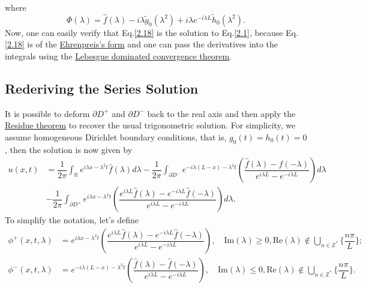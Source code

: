 \documentclass[12pt]{article}
\numberwithin{equation}{section}
\begin{document}
where 
\begin{equation}
    \Phi(\lambda)=\hat{f}(\lambda)-i\lambda\tilde{g}_0(\lambda^2)+i\lambda e^{-i\lambda L}\tilde{h}_0(\lambda^2).
\end{equation}
Now, one can easily verify that Eq.\eqref{2.18} is the solution to Eq.\eqref{2.1}, because Eq.\eqref{2.18} is of the \href{https://w.wiki/9aTe}{Ehrenpreis's form} and one can pass the derivatives into the integrals using the \href{https://w.wiki/9asL}{Lebesgue dominated convergence theorem}.

\subsection{Rederiving the Series Solution}
It is possible to deform $\partial D^+$ and $\partial D^-$ back to the real axis and then apply the \href{https://w.wiki/9dCo}{Residue theorem} to recover the usual trigonometric solution. For simplicity, we assume homogeneous Dirichlet boundary conditions, that is, $g_0(t)=h_0(t)=0$, then the solution is now given by 
\begin{equation}\label{2.20}
    \begin{split}
        u(x,t)&=\dfrac{1}{2\pi}\int_{\mathbb{R}} e^{i\lambda x-\lambda^2t}\hat{f}(\lambda)d\lambda-\dfrac{1}{2\pi}\int_{\partial D^-} e^{-i\lambda(L-x)-\lambda^2 t}\left(\dfrac{\hat{f}(\lambda)-\hat{f}(-\lambda)}{e^{i\lambda L}-e^{-i\lambda L}}\right) d\lambda \\
        &-\dfrac{1}{2\pi}\int_{\partial D^+}e^{i\lambda x-\lambda^2 t}\left(\dfrac{e^{i\lambda L}\hat{f}(\lambda)-e^{-i\lambda L}\hat{f}(-\lambda)}{e^{i\lambda L}-e^{-i\lambda L}}\right) d\lambda.
    \end{split}
\end{equation}
To simplify the notation, let's define 
\begin{equation*}
    \begin{split}
    \phi^+(x,t,\lambda)&=e^{i\lambda x-\lambda^2 t}\left(\dfrac{e^{i\lambda L}\hat{f}(\lambda)-e^{-i\lambda L}\hat{f}(-\lambda)}{e^{i\lambda L}-e^{-i\lambda L}}\right),\quad \text{Im}(\lambda)\geqslant 0, \text{Re}(\lambda)\notin  \bigcup_{n\in\mathbb{Z}^*}\{\dfrac{n\pi}{L}\};\\
    \phi^-(x,t,\lambda)&=e^{-i\lambda(L-x)-\lambda^2 t}\left(\dfrac{\hat{f}(\lambda)-\hat{f}(-\lambda)}{e^{i\lambda L}-e^{-i\lambda L}}\right),\quad \text{Im}(\lambda)\leqslant 0, \text{Re}(\lambda)\notin  \bigcup_{n\in\mathbb{Z}^*}\{\dfrac{n\pi}{L}\}.
    \end{split}
\end{equation*}
\end{document}

